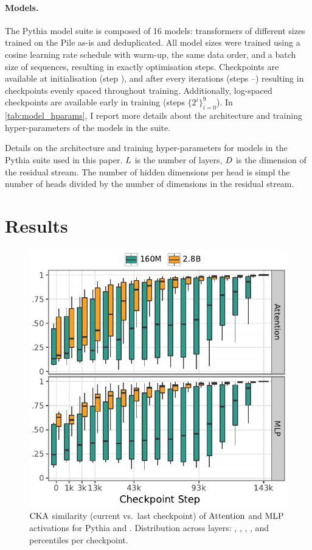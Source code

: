 \paragraph{Models.}
The Pythia model suite is composed of 16 models: transformers of  different sizes trained on the Pile as-is and deduplicated.
All model sizes were trained using a cosine learning rate schedule with warm-up, the same data order, and a batch size of  sequences, resulting in exactly  optimisation steps.
Checkpoints are available at initialisation (step ), and after every  iterations (steps --) resulting in  checkpoints evenly spaced throughout training. 
Additionally, log-spaced checkpoints are available early in training (steps $\{2^i\}_{i=0}^{9}$). In \cref{tab:model_hparams}, I report more details about the architecture and training hyper-parameters of the models in the suite.

\begin{table}[!t]
    \centering
    
    \caption{Details on the architecture and training hyper-parameters for models in the Pythia suite used in this paper. $L$ is the number of layers, $D$ is the dimension of the residual stream. The number of hidden dimensions per head is simpl the number of heads divided by the number of dimensions in the residual stream.}
    \label{tab:model_hparams}
\end{table}


\clearpage
\section{Results}
\label{sec:tending-towards-stability-results}

\begin{figure}
    \vspace{-36pt}
    \centering
    \includegraphics[width=0.54\columnwidth]{chapters/tending-towards-stability/figures/cka_main_plot.pdf}
    \caption{$\mathrm{CKA}$ similarity (current vs.\ last checkpoint) of $\mathrm{Attention}$ and $\mathrm{MLP}$ activations for Pythia \sixmil and \twobil. Distribution across layers: , , , , and  percentiles per checkpoint.}
    \label{fig:cka_main_plot}
    \vspace{-1em}
\end{figure}

